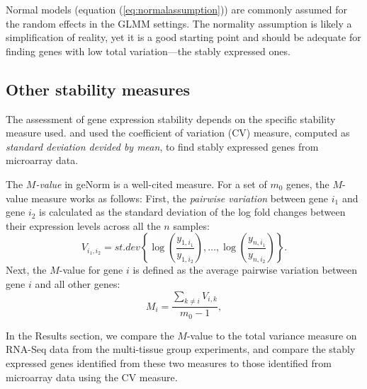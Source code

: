 \documentclass[letterpaper,12pt]{article}
\begin{document}
Normal models (equation (\ref{eq:normalassumption})) are commonly assumed for
the random effects in the GLMM settings. The normality assumption is likely a
simplification of reality, yet it is a good starting point and should be
adequate for finding genes with low total variation---the stably expressed
ones.

\subsection{Other stability measures}\label{subsection:OtherStabilityMeasure}
The assessment of gene expression stability depends on the specific stability
measure used. 
\cite{czechowski2005genome} and \cite{dekkers2012identification} used  the
coefficient of variation (CV) measure, computed as \textit{standard
deviation devided by mean}, to find stably expressed genes from microarray data.


The \textit{$M$-value} in geNorm \citep{vandesompele2002accurate} is a
well-cited measure. For a set of $m_0$ genes, the $M$-value measure works as
follows: First, the {\em pairwise variation} between gene $i_1$ and gene $i_2$ is
calculated as the standard deviation of the log fold changes between their
expression levels across all the $n$ samples: 
 	\[V_{i_1, i_2} =\textit{st.dev}
	\left\{\log\left(\dfrac{y_{1,i_1}}{y_{1, i_2}}\right),\ldots,
	\log\left(\dfrac{y_{n, i_1}}{y_{n, i_2}}\right) \right\}.\]
Next, the $M$-value for gene $i$ is defined as the average pairwise
variation between gene $i$ and all other genes:
\[M_{i} = \frac{\sum_{k\neq i}V_{i, k}}{m_0-1},\] 
			

In the Results section, we compare the $M$-value to the total variance measure
on RNA-Seq data from the multi-tissue group experiments, and compare the
stably expressed genes identified from these two measures to those identified
from microarray data using the CV measure.
\end{document}

